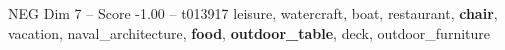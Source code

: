 \begin{textsample}{NEG Dim 7 – Score -1.00 – t013917}  \label{ex:f7_neg_010}
leisure, watercraft, boat, restaurant, \textbf{chair}, vacation, naval\_architecture, \textbf{food}, \textbf{outdoor\_table}, deck, outdoor\_furniture

\end{textsample}
